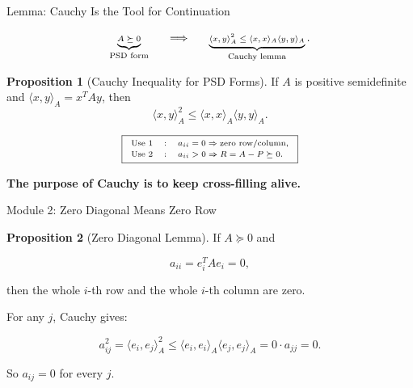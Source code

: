 \documentclass[10pt]{beamer}
\theoremstyle{definition}
\newtheorem{prop}{Proposition}[section]
\newcommand{\x}[1]{\alert{\textbf{#1}}}
\begin{document}
\begin{frame}[shrink=8]{Lemma: Cauchy Is the Tool for Continuation}

\[
\scriptsize
\underbrace{A\succeq0}_{\text{PSD form}}
\qquad\Longrightarrow\qquad
\underbrace{\langle x,y\rangle_A^2
\le
\langle x,x\rangle_A\langle y,y\rangle_A}_{\text{Cauchy lemma}}.
\]

\vfill

\begin{prop}[Cauchy Inequality for PSD Forms]
If $A$ is positive semidefinite and $\langle x,y\rangle_A=x^TAy$, then
$$
\langle x,y\rangle_A^2
\le
\langle x,x\rangle_A\langle y,y\rangle_A.
$$
\end{prop}

\vfill

\[
\scriptsize
\boxed{
\begin{array}{ccl}
\text{Use 1} &:& a_{ii}=0\Rightarrow \text{zero row/column},\\[0.2em]
\text{Use 2} &:& a_{ii}>0\Rightarrow R=A-P\succeq0.
\end{array}}
\]

\vfill

\begin{center}
\x{The purpose of Cauchy is to keep cross-filling alive.}
\end{center}

\end{frame}


\begin{frame}{Module 2: Zero Diagonal Means Zero Row}

\begin{prop}[Zero Diagonal Lemma]
If $A\succeq0$ and

$$
a_{ii}=e_i^TAe_i=0,
$$

then the whole $i$-th row and the whole $i$-th column are zero.
\end{prop}

\vfill

For any $j$, Cauchy gives:

$$
a_{ij}^2
=\langle e_i,e_j\rangle_A^2
\le
\langle e_i,e_i\rangle_A\langle e_j,e_j\rangle_A
=0\cdot a_{jj}=0.
$$

\vfill

So $a_{ij}=0$ for every $j$.

\end{frame}
\end{document}
